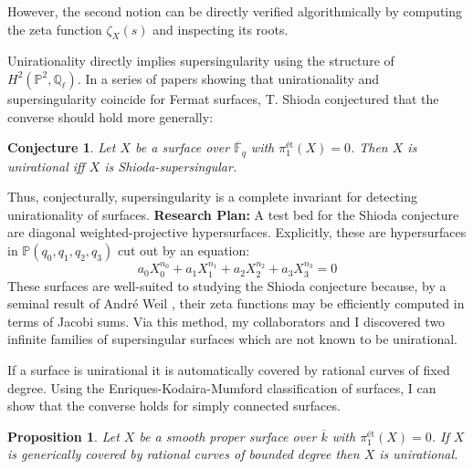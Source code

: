 \documentclass[11pt]{article}
\newcommand{\et}{\text{\'{e}t}}
\newcommand{\Q}{\mathbb{Q}}
\renewcommand{\P}{\mathbb{P}}
\newtheorem*{conj}{Conjecture}
\newtheorem*{prop}{Proposition}
\begin{document}
However, the second notion can be directly verified algorithmically by computing the zeta function $\zeta_X(s)$ and inspecting its roots.
\par
Unirationality directly implies supersingularity using the structure of $H^2(\P^2, \Q_\ell)$. In a series of papers showing that unirationality and supersingularity coincide for Fermat surfaces, T. Shioda conjectured  that the converse should hold more generally:
\begin{conj}
Let $X$ be a surface over $\overline{\mathbb{F}}_q$ with $\pi_1^{\et}(X) = 0$. Then $X$ is unirational iff $X$ is Shioda-supersingular.
\end{conj}
\noindent
Thus, conjecturally, supersingularity is a complete invariant for detecting unirationality of surfaces.
\vspace{0.5em}
\newline
\noindent
\textbf{Research Plan:}
A test bed for the Shioda conjecture are diagonal weighted-projective hypersurfaces. Explicitly, these are hypersurfaces in $\P(q_0, q_1, q_2, q_3)$ cut out by an equation:
\begin{equation}
a_0 X_0^{n_0} + a_1 X_1^{n_1} + a_2 X_2^{n_2} + a_3 X_3^{n_3} = 0
\end{equation}
These surfaces are well-suited to studying the Shioda conjecture because, by a seminal result of Andr\'{e} Weil , their zeta functions may be efficiently computed in terms of Jacobi sums. Via this method, my collaborators and I discovered two infinite families of supersingular surfaces which are not known to be unirational. 
\par
If a surface is unirational it is automatically covered by rational curves of fixed degree. Using the Enriques-Kodaira-Mumford classification  of surfaces, I can show that the converse holds for simply connected surfaces.

\begin{prop}
Let $X$ be a smooth proper surface over $\overline{k}$ with $\pi_1^{\et}(X) = 0$. If $X$ is generically covered by rational curves of bounded degree then $X$ is unirational.
\end{prop}
\end{document}
